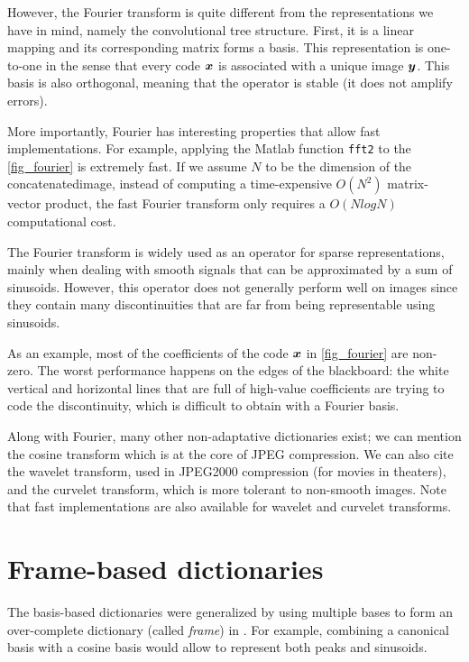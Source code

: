 However, the Fourier transform is quite different from the representations we have in mind, namely the convolutional tree structure. First, it is a linear mapping and its corresponding matrix forms a basis. This representation is one-to-one in the sense that every code $\bm{x}$ is associated with a unique image $\bm{y}$. This basis is also orthogonal, meaning that the operator is stable (it does not amplify errors). %

More importantly, Fourier has interesting properties that allow fast implementations. For example, applying the Matlab function \texttt{fft2} to the \cref{fig_fourier} is extremely fast. If we assume $N$ to be the dimension of the concatenated\footnotemark[1] image, instead of computing a time-expensive $O(N^2)$ matrix-vector product, the fast Fourier transform only requires a $O(NlogN)$ computational cost.



The Fourier transform is widely used as an operator for sparse representations, mainly when dealing with smooth signals that can be approximated by a sum of sinusoids. However, this operator does not generally perform well on images since they contain many discontinuities that are far from being representable using sinusoids.

As an example, most of the coefficients of the code $\bm{x}$ in \cref{fig_fourier} are non-zero. The worst performance happens on the edges of the blackboard: the white vertical and horizontal lines that are full of high-value coefficients are trying to code the discontinuity, which is difficult to obtain with a Fourier basis.

Along with Fourier, many other non-adaptative dictionaries exist; we can mention the cosine transform which is at the core of JPEG compression. We can also cite the wavelet transform, used in JPEG2000 compression (for movies in theaters), and the curvelet transform, which is more tolerant to non-smooth images. Note that fast implementations are also available for wavelet and curvelet transforms.


\section{Frame-based dictionaries}

The basis-based dictionaries were generalized by using multiple bases to form an over-complete dictionary (called \emph{frame}) in \cite{chen_atomic_2001}. For example, combining a canonical basis with a cosine basis would allow to represent both peaks and sinusoids.

